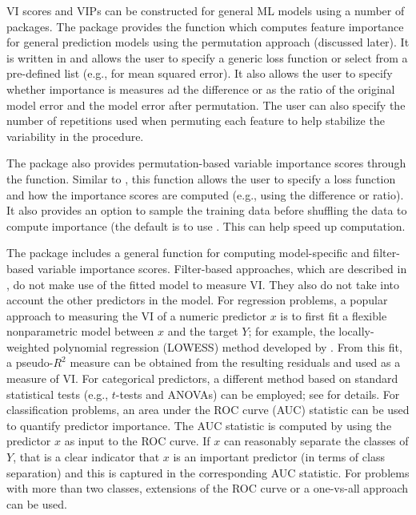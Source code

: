 VI scores and VIPs can be constructed for general ML models using a number of packages. The  package \citep{iml-pkg} provides the  function which computes feature importance for general prediction models using the permutation approach (discussed later). It is written in  \citep{R6-pkg} and allows the user to specify a generic loss function or select from a pre-defined list (e.g.,  for mean squared error). It also allows the user to specify whether importance is measures ad the difference or as the ratio of the original model error and the model error after permutation. The user can also specify the number of repetitions used when permuting each feature to help stabilize the variability in the procedure.

The  package \citep{DALEX-pkg} also provides permutation-based variable importance scores through the  function. Similar to , this function allows the user to specify a loss function and how the importance scores are computed (e.g., using the difference or ratio). It also provides an option to sample the training data before shuffling the data to compute importance (the default is to use . This can help speed up computation.

The  package \citep{caret-pkg} includes a general  function for computing model-specific and filter-based variable importance scores. Filter-based approaches, which are described in \citet{applied-kuhn-2013}, do not make use of the fitted model to measure VI. They also do not take into account the other predictors in the model. For regression problems, a popular approach to measuring the VI of a numeric predictor $x$ is to first fit a flexible nonparametric model between $x$ and the target $Y$; for example, the locally-weighted polynomial regression (LOWESS) method developed by \citet{robust-cleveland-1979}. From this fit, a pseudo-$R^2$ measure can be obtained from the resulting residuals and used as a measure of VI. For categorical predictors, a different method based on standard statistical tests (e.g., $t$-tests and ANOVAs) can be employed; see
\citet{applied-kuhn-2013} for details. For classification problems, an area under the ROC curve (AUC) statistic can be used to quantify predictor importance. The AUC statistic is computed by using the predictor $x$ as input to the ROC curve. If $x$ can reasonably separate the classes of $Y$, that is a clear indicator that $x$ is an important predictor (in terms of class separation) and this is captured in the corresponding AUC statistic. For problems with more than two classes, extensions of the ROC curve or a one-vs-all approach can be used.


